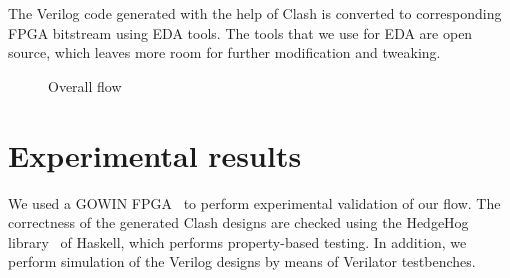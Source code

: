 \documentclass{article}
\begin{document}
The Verilog code generated with the help of Clash is converted to
corresponding FPGA bitstream using \gls{EDA} tools.
The tools that we use for \gls{EDA} are open source, which leaves more
room for further modification and tweaking.

\begin{figure}
  \centering
{}
\caption{Overall flow}
\label{fig:flow}
\end{figure}

\section{Experimental results}
We used a GOWIN FPGA~\cite{gowinweb} to perform experimental
validation of our flow. 
%
The correctness of the generated Clash designs are checked using the
HedgeHog library~\cite{hedgehog} of Haskell, which performs
property-based testing.
In addition, we perform simulation of the Verilog designs by means of
Verilator testbenches.
\end{document}
